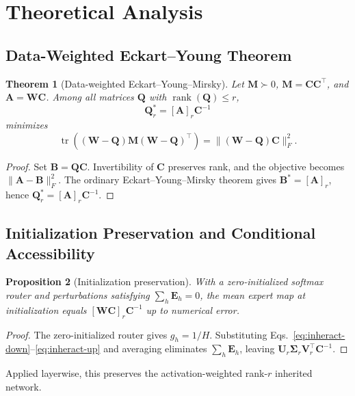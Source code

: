 \documentclass{article}
\newtheorem{theorem}{Theorem}
\newtheorem{proposition}[theorem]{Proposition}
\DeclareMathOperator{\tr}{tr}
\DeclareMathOperator{\rank}{rank}
\newcommand{\bW}{\mathbf{W}}
\newcommand{\bM}{\mathbf{M}}
\newcommand{\bC}{\mathbf{C}}
\newcommand{\bA}{\mathbf{A}}
\newcommand{\bB}{\mathbf{B}}
\newcommand{\bE}{\mathbf{E}}
\newcommand{\bQ}{\mathbf{Q}}
\newcommand{\bU}{\mathbf{U}}
\newcommand{\bV}{\mathbf{V}}
\newcommand{\bSigma}{\mathbf{\Sigma}}
\begin{document}
\section{Theoretical Analysis}
\label{sec:theory}

\subsection{Data-Weighted Eckart--Young Theorem}

\begin{theorem}[Data-weighted Eckart--Young--Mirsky]
Let $\bM\succ0$, $\bM=\bC\bC^\top$, and $\bA=\bW\bC$.  Among all matrices
$\bQ$ with $\rank(\bQ)\leq r$,
\begin{equation}
  \bQ_r^*=[\bA]_r\bC^{-1}
\end{equation}
minimizes
\begin{equation}
  \tr\!\left((\bW-\bQ)\bM(\bW-\bQ)^\top\right)
  =\|(\bW-\bQ)\bC\|_F^2.
\end{equation}
\end{theorem}

\begin{proof}
Set $\bB=\bQ\bC$.  Invertibility of $\bC$ preserves rank, and the objective
becomes $\|\bA-\bB\|_F^2$.  The ordinary Eckart--Young--Mirsky theorem
\cite{eckart1936approximation} gives
$\bB^*=[\bA]_r$, hence $\bQ_r^*=[\bA]_r\bC^{-1}$.
\end{proof}

\subsection{Initialization Preservation and Conditional Accessibility}

\begin{proposition}[Initialization preservation]
With a zero-initialized softmax router and perturbations satisfying
$\sum_h\bE_h=0$, the mean expert map at initialization equals
$[\bW\bC]_r\bC^{-1}$ up to numerical error.
\end{proposition}

\begin{proof}
The zero-initialized router gives $g_h=1/H$.  Substituting
Eqs.~\eqref{eq:inheract-down}--\eqref{eq:inheract-up} and averaging eliminates
$\sum_h\bE_h$, leaving
$\bU_r\bSigma_r\bV_r^\top\bC^{-1}$.
\end{proof}

Applied layerwise, this preserves the activation-weighted rank-$r$ inherited
network.
\end{document}
